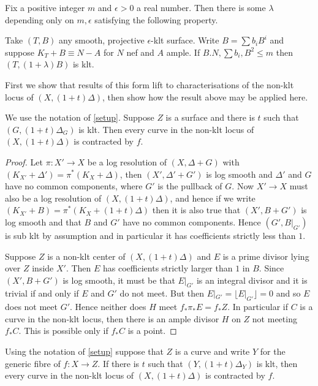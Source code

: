 \documentclass[a4paper,12pt]{book}
\begin{document}
\begin{theorem}\label{Jiang}\cite[Theorem 5.1]{jiang2018birational}
	Fix a positive integer $m$ and $\epsilon >0$ a real number. Then there is some $\lambda$ depending only on $m,\epsilon$ satisfying the following property.
	
	Take $(T,B)$ any smooth, projective $\epsilon$-klt surface. Write $B=\sum b_{i}B^{i}$ and suppose $K_{T}+B \equiv N-A$ for $N$ nef and $A$ ample. If $B.N,\sum b_{i}, B^{2} \leq m$ then $(T,(1+\lambda)B)$ is klt. 
\end{theorem}
First we show that results of this form lift to characterisations of the non-klt locus of $(X,(1+t)\Delta)$, then show how the result above may be applied here.
\begin{lemma}
	We use the notation of \autoref{setup}. Suppose $Z$ is a surface and there is $t$ such that $(G,(1+t)\Delta_{G})$ is klt. Then every curve in the non-klt locus of $(X,(1+t)\Delta)$ is contracted by $f$.
\end{lemma}
\begin{proof}
	Let $\pi\colon X' \to X$ be a log resolution of $(X,\Delta+G)$ with $(K_{X'}+\Delta')=\pi^{*}(K_{X}+\Delta)$, then $(X',\Delta'+G')$ is log smooth and $\Delta'$ and $G$ have no common components, where $G'$ is the pullback of $G$. Now $X' \to X$ must also be a log resolution of $(X,(1+t)\Delta)$, and hence if we write $(K_{X'}+B)=\pi^{*}(K_{X}+(1+t)\Delta)$ then it is also true that $(X',B+G')$ is log smooth and that $B$ and $G'$ have no common components. Hence $(G',B|_{G'})$ is sub klt by assumption and in particular it has coefficients strictly less than $1$. 
	
	Suppose $Z$ is a non-klt center of $(X,(1+t)\Delta)$ and $E$ is a prime divisor lying over $Z$ inside $X'$. Then $E$ has coefficients strictly larger than $1$ in $B$. Since $(X',B+G')$ is log smooth, it must be that $E|_{G'}$ is an integral divisor and it is trivial if and only if $E$ and $G'$ do not meet. But then $E|_{G'} =\lfloor E|_{G'} \rfloor =0$ and so $E$ does not meet $G'$. Hence neither does $H$ meet $f_{*}\pi_{*}E=f_{*}Z$. In particular if $C$ is a curve in the non-klt locus, then there is an ample divisor $H$ on $Z$ not meeting $f_{*}C$. This is possible only if $f_{*}C$ is a point. 
\end{proof}


\begin{lemma}
	Using the notation of \autoref{setup} suppose that $Z$ is a curve and write $Y$ for the generic fibre of $f\colon X\to Z$. If there is $t$ such that $(Y,(1+t)\Delta_{Y})$ is klt, then every curve in the non-klt locus of $(X,(1+t)\Delta)$ is contracted by $f$.
\end{lemma}
\end{document}
